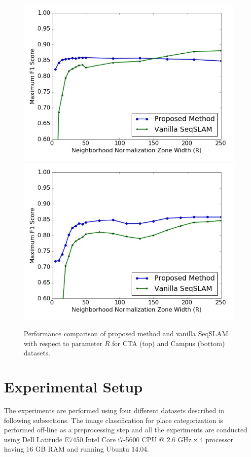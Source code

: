 \documentclass[letterpaper, 10 pt, conference]{ieeeconf}  %
\begin{document}
\begin{figure}
\centering
 \includegraphics[scale=0.3]{RPerformance1} \\
 \includegraphics[scale=0.3]{RPerformance2}
 \caption{Performance comparison of proposed method and vanilla SeqSLAM with respect to parameter $R$ for CTA (top) and Campus (bottom) datasets.}
 \label{fig:RPerformance}
\end{figure}


\section{Experimental Setup}
The experiments are performed using four different datasets described in following subsections. The image classification for place categorization is performed off-line as a preprocessing step and all the experiments are conducted using Dell Latitude E7450 Intel Core i7-5600 CPU @ 2.6 GHz x 4 processor having 16 GB RAM and running Ubuntu 14.04.
\end{document}
